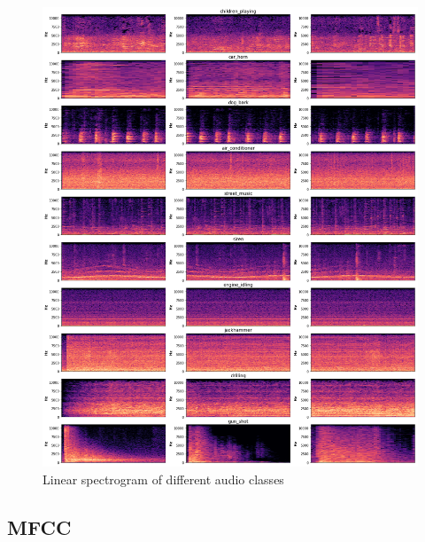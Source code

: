 \begin{figure}[H]
    \centering
	\includegraphics[width=.9\textwidth]{./images/features/spec-lin}
    \caption{Linear spectrogram of different audio classes}
    \label{fig:spec}
\end{figure}


\subsection{MFCC}


